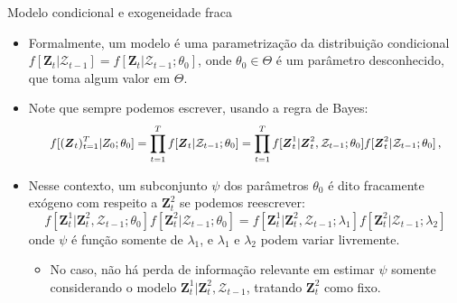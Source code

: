\documentclass[11pt]{beamer}
\begin{document}
\begin{frame}{Modelo condicional e exogeneidade fraca}
	\begin{itemize}
		\item Formalmente, um modelo é uma parametrização da distribuição condicional  $f[\boldsymbol{Z}_t|\mathcal{Z}_{t-1}] = f[\boldsymbol{Z}_t|\mathcal{Z}_{t-1};\theta_0] $, onde $\theta_0 \in \Theta$ é um parâmetro desconhecido, que toma algum valor em $\Theta$.
		
		\item Note que sempre podemos escrever, usando a regra de Bayes:
			$$\small f[(\boldsymbol{Z}_t)_{t=1}^T|Z_0;\theta_0] = \prod_{t=1}^T f[\boldsymbol{Z}_t|\mathcal{Z}_{t-1};\theta_0] = \prod_{t=1}^T f[\boldsymbol{Z}_t^1|\boldsymbol{Z}^2_t,\mathcal{Z}_{t-1};\theta_0] f[\boldsymbol{Z}_t^2|\mathcal{Z}_{t-1};\theta_0] \, ,$$
		\item Nesse contexto, um subconjunto $\psi$ dos parâmetros $\theta_0$ é dito {\color{blue}fracamente exógeno com respeito a $\boldsymbol{Z}^2_t$} se podemos reescrever:
		$$f[\boldsymbol{Z}_t^1|\boldsymbol{Z}^2_t,\mathcal{Z}_{t-1};\theta_0] f[\boldsymbol{Z}_t^2|\mathcal{Z}_{t-1};\theta_0]  = f[\boldsymbol{Z}_t^1|\boldsymbol{Z}^2_t,\mathcal{Z}_{t-1};\lambda_1] f[\boldsymbol{Z}_t^2|\mathcal{Z}_{t-1};\lambda_2]  $$
		onde $\psi$ é  função somente de $\lambda_1$, e $\lambda_1$ e $\lambda_2$ podem variar {\color{blue}livremente}.
		\begin{itemize}
			\item No caso, não há perda de informação relevante em estimar $\psi$ somente considerando o modelo $\boldsymbol{Z}_t^1|\boldsymbol{Z}^2_t,\mathcal{Z}_{t-1}$, tratando $\boldsymbol{Z}^2_t$ como fixo.


		\end{itemize}
	\end{itemize}
\end{frame}
\end{document}
